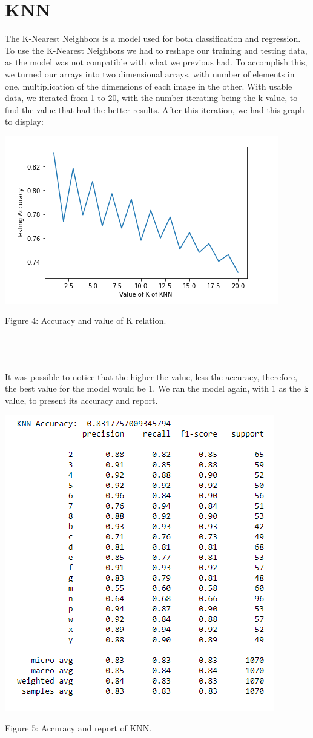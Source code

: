 \documentclass[conference]{IEEEtran}
\begin{document}
\section{KNN}
The K-Nearest Neighbors is a model used for both classification and regression. To use the K-Nearest Neighbors we had to reshape our training and testing data, as the model was not compatible with what we previous had. To accomplish this, we turned our arrays into two dimensional arrays, with number of elements in one, multiplication of the dimensions of each image in the other.  
With usable data, we iterated from 1 to 20, with the number iterating being the k value, to find the value that had the better results. After this iteration, we had this graph to display:
\begin{center}
\includegraphics[scale=0.55]{knn.png}
\caption{Figure 4: Accuracy and value of K relation.}
\end{center}
\\ \\ \\
It was possible to notice that the higher the value, less the accuracy, therefore, the best value for the model would be 1. We ran the model again, with 1 as the k value, to present its accuracy and report. \begin{center}
\includegraphics[scale=0.55]{knnreport.png}
\caption{Figure 5: Accuracy and report of KNN.}
\end{center}
\end{document}
